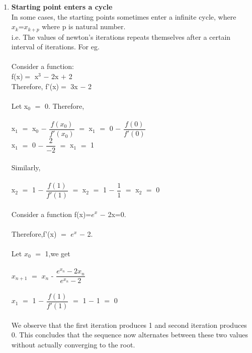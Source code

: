 \documentclass[15pt]{report}
\begin{document}
\begin{enumerate}
\item \textbf{Starting point enters a cycle}\\ In some cases, the starting points sometimes enter a infinite cycle, where \\
\hspace*{20mm}$x_{k}$=$x_{k+p}$  \hspace*{20mm} where p is natural number.\\
i.e. The values of newton's iterations repeats themselves after a certain interval of iterations. For eg. \\ \\
Consider a function: \\
f(x)$=$ x$^{3}$ $-$ 2x $+$ 2\\
Therefore, f'(x)$=$ 3x $-$ 2\\ \\
Let x$_{0}$ $=$ 0. Therefore, \\ \\
x$_{1}$ $=$ x$_{0}$ $-$ $\dfrac{f(x_{0})}{f'(x_{0})}$ $=$ x$_{1}$ $=$ 0 $-$ $\dfrac{f(0)}{f'(0)}$ \\
x$_{1}$ $=$ 0 $-$ $\dfrac{2}{-2}$ $=$ x$_{1}$ $=$ 1\\ \\
Similarly,\\ \\
x$_{2}$ $=$ 1 $-$ $\dfrac{f(1)}{f'(1)}$ $=$ x$_{2}$ $=$ 1 $-$ $\dfrac{1}{1}$ $=$ x$_{2}$ $=$ 0\\ \\

Consider a function f(x)=$e^{x}$ $-$ 2x=0.\\ \\
Therefore,f'(x) $=$ $e^{x}$ $-$ 2.\\ \\ 
Let $x_{0}$ $=$ 1,we get\\ \\ 
$x_{n+1}$ $=$ $x_{n}$ - $\dfrac{e^{x_{n}} - 2x_{n}}{e^{x_{n}} - 2}$\\ \\
$x_{1}$ $=$ 1 $-$ $\dfrac{f(1)}{f'(1)}$ $=$ 1 $-$ 1 $=$ 0 \\ \\


We observe that the first iteration produces 1 and second iteration produces 0. This concludes that the sequence now alternates between these two values without actually converging to the root. 
\end{enumerate}
\end{document}
